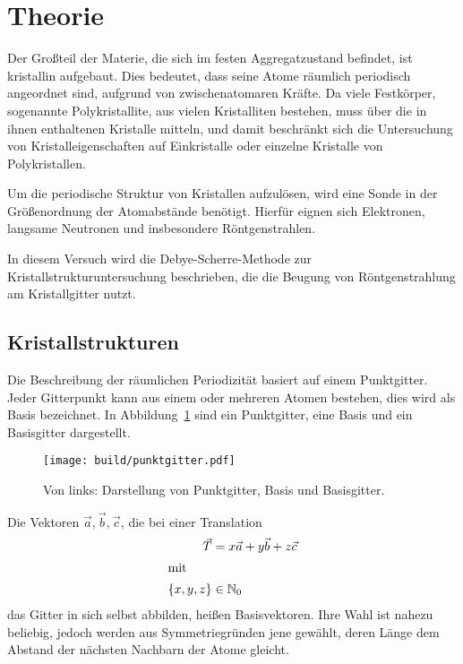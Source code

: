 \section{Theorie}\label{sec:Theorie}
\nocite{anleitung}

Der Großteil der Materie, die sich im festen Aggregatzustand befindet,
ist kristallin aufgebaut.
Dies bedeutet, dass seine Atome räumlich periodisch angeordnet sind,
aufgrund von zwischenatomaren Kräfte.
Da viele Festkörper, sogenannte Polykristallite, aus vielen Kristalliten bestehen,
muss über die in ihnen enthaltenen Kristalle mitteln, und damit beschränkt sich die
Untersuchung von Kristalleigenschaften auf Einkristalle oder einzelne Kristalle
von Polykristallen.

Um die periodische Struktur von Kristallen aufzulösen, wird eine Sonde in der
Größenordnung der Atomabstände benötigt.
Hierfür eignen sich Elektronen, langsame Neutronen und insbesondere Röntgenstrahlen.

In diesem Versuch wird die Debye-Scherre-Methode zur Kristallstrukturuntersuchung beschrieben,
die die Beugung von Röntgenstrahlung am Kristallgitter nutzt.

\subsection{Kristallstrukturen}%
\label{sub:kristallstrukturen}
Die Beschreibung der räumlichen Periodizität basiert auf einem Punktgitter.
Jeder Gitterpunkt kann aus einem oder mehreren Atomen bestehen,
dies wird als Basis bezeichnet.
In Abbildung~\ref{fig:punktgitter} sind ein Punktgitter, eine Basis und ein Basisgitter
dargestellt.
\begin{figure}
  \centering
  \texttt{[image: build/punktgitter.pdf]}
  \caption{Von links: Darstellung von Punktgitter, Basis und Basisgitter.\cite{anleitung}}%
  \label{fig:punktgitter}
\end{figure}

Die Vektoren $\vec{a}, \vec{b}, \vec{c}$, die bei einer Translation
\begin{align}
  \vec{T} &= x\vec{a} + y\vec{b} + z\vec{c} \\
  \intertext{mit}
  \left\{x, y, z\right\} &\in \mathbb{N}_0
\end{align}
das Gitter in sich selbst abbilden, heißen Basisvektoren.
Ihre Wahl ist nahezu beliebig, jedoch werden aus Symmetriegründen jene gewählt,
deren Länge dem Abstand der nächsten Nachbarn der Atome gleicht.

